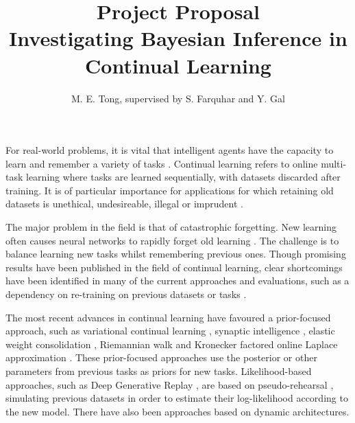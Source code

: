 \documentclass[a4paper,11=0pt]{article}
\title{\vspace*{-2em}\textbf{Project Proposal}\\ \vspace{0.25em} \Large Investigating Bayesian Inference in Continual Learning}
\author{M. E. Tong, supervised by S. Farquhar and Y. Gal}
\date{}
\begin{document}
\maketitle


\vspace{-1em}
For real-world problems, it is vital that intelligent agents have the capacity to learn and remember a variety of tasks \cite{ewc}. Continual learning refers to online multi-task learning where tasks are learned sequentially, with datasets discarded after training. It is of particular importance for applications for which retaining old datasets is unethical, undesireable, illegal or imprudent \cite{unifying, robust}. %

The major problem in the field is that of catastrophic forgetting. New learning often causes neural networks to rapidly forget old learning \cite{catastrophic}. The challenge is to balance learning new tasks whilst remembering previous ones. Though promising results have been published in the field of continual learning, clear shortcomings have been identified in many of the current approaches and evaluations, such as a dependency on re-training on previous datasets or tasks \cite{robust}. 

The most recent advances in continual learning have favoured a prior-focused approach, such as variational continual learning \cite{vcl}, synaptic intelligence \cite{si}, elastic weight consolidation \cite{ewc}, Riemannian walk \cite{rw} and Kronecker factored online Laplace approximation \cite{ritter}. These prior-focused approaches use the posterior or other parameters from previous tasks as priors for new tasks. Likelihood-based approaches, such as Deep Generative Replay \cite{dgr}, are based on pseudo-rehearsal \cite{robins}, simulating previous datasets in order to estimate their log-likelihood according to the new model. There have also been approaches based on dynamic architectures. %

\end{document}
